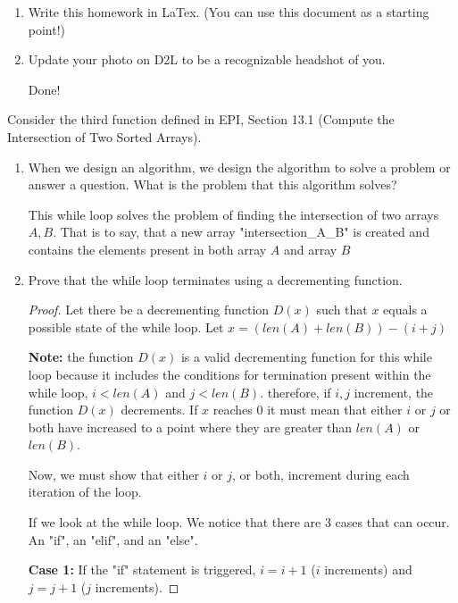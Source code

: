 \documentclass{article}
\author{Troy Daneel Oster}
\date{due: 6 September 2019}
\begin{document}
\nextprob
\begin{enumerate}
    \item Write this homework in LaTex.  (You can use this document as a
        starting point!)
    \item Update your photo on D2L to be a recognizable headshot of you.
    
    Done!

\end{enumerate}
\nextprob
Consider the third function defined in EPI, Section 13.1 (Compute the
Intersection of Two Sorted Arrays).
\begin{enumerate}
    \item When we design an algorithm, we design the algorithm to solve a
        problem or answer a question.  What is the problem that this algorithm
        solves?

        This while loop solves the problem of finding the intersection of two arrays $A,B$. That is to say,
        that a new array "intersection\_A\_B" is created and contains the elements present in both array $A$ and array $B$
    
    \item Prove that the while loop terminates using a decrementing function.
    
    \begin{proof}
        Let there be a decrementing function $D(x)$ such that $x$ equals a possible state of the while loop.
        Let $x=(len(A)+len(B)) - (i+j)$
        
        \vspace{0.5cm}

        \textbf{Note:} the function $D(x)$ is a valid decrementing function for this while loop because it includes
        the conditions for termination present within the while loop, $i<len(A)$ and $j<len(B)$. therefore, if $i,j$ increment,
        the function $D(x)$ decrements. If $x$ reaches $0$ it must mean that either $i$ or $j$ or both have increased to a point where they are greater than $len(A)$ or $len(B)$.

        Now, we must show that either $i$ or $j$, or both, increment during each iteration of the loop.

        If we look at the while loop. We notice that there are 3 cases that can occur. An "if", an "elif", and an "else".

        \vspace{0.5cm}

        \textbf{Case 1:} If the "if" statement is triggered, $i=i+1$ ($i$ increments) and $j = j+1$ ($j$ increments).


\end{proof}
\end{enumerate}
\end{document}
